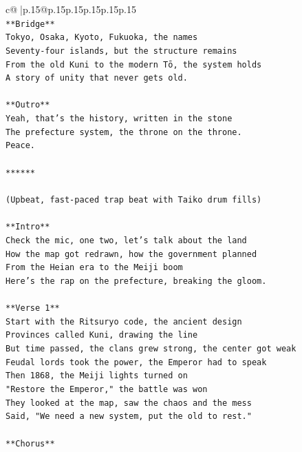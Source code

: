 \documentclass{article}
\begin{document}
{\begin{supertabular}{c@{$\;$}|p{.15\linewidth}@{}p{.15\linewidth}p{.15\linewidth}p{.15\linewidth}p{.15\linewidth}p{.15\linewidth}}
{{{\\ 
\texttt{**Bridge**} \\
\texttt{Tokyo, Osaka, Kyoto, Fukuoka, the names} \\
\texttt{Seventy{-}four islands, but the structure remains} \\
\texttt{From the old Kuni to the modern Tō, the system holds} \\
\texttt{A story of unity that never gets old.} \\
\\ 
\texttt{**Outro**} \\
\texttt{Yeah, that's the history, written in the stone} \\
\texttt{The prefecture system, the throne on the throne.} \\
\texttt{Peace.} \\
\\ 
\texttt{******} \\
\\ 
\texttt{(Upbeat, fast{-}paced trap beat with Taiko drum fills)} \\
\\ 
\texttt{**Intro**} \\
\texttt{Check the mic, one two, let's talk about the land} \\
\texttt{How the map got redrawn, how the government planned} \\
\texttt{From the Heian era to the Meiji boom} \\
\texttt{Here's the rap on the prefecture, breaking the gloom.} \\
\\ 
\texttt{**Verse 1**} \\
\texttt{Start with the Ritsuryo code, the ancient design} \\
\texttt{Provinces called Kuni, drawing the line} \\
\texttt{But time passed, the clans grew strong, the center got weak} \\
\texttt{Feudal lords took the power, the Emperor had to speak} \\
\texttt{Then 1868, the Meiji lights turned on} \\
\texttt{"Restore the Emperor," the battle was won} \\
\texttt{They looked at the map, saw the chaos and the mess} \\
\texttt{Said, "We need a new system, put the old to rest."} \\
\\ 
\texttt{**Chorus**} \\
}}}
\end{supertabular}}
\end{document}
